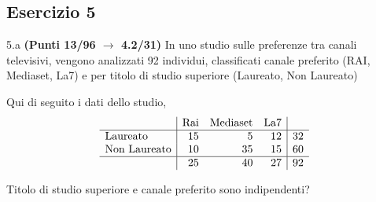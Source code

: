 \documentclass[
  11pt,
]{book}
\theoremstyle{mytheoremstyle}
\theoremstyle{mydefstyle}
\begin{document}
\subsection{Esercizio 5}\label{esercizio-5-4}

5.a \textbf{(Punti 13/96 \(\rightarrow\) 4.2/31)} In uno studio sulle preferenze tra canali televisivi, vengono analizzati 92
individui, classificati canale preferito (RAI, Mediaset, La7) e per titolo di studio superiore (Laureato, Non Laureato)

Qui di seguito i dati dello studio,
\[
\begin{array}{l|rrr|r}
 & \text{Rai} &\text{Mediaset} &\text{La7}& \\ \hline
 \text{Laureato}     &15 &5 &12  &32\\ 
 \text{Non Laureato} &10 &35  &15 &60\\ \hline
                     &25 &40  &27 &92 
\end{array}
\]

Titolo di studio superiore e canale preferito sono indipendenti?
\end{document}
